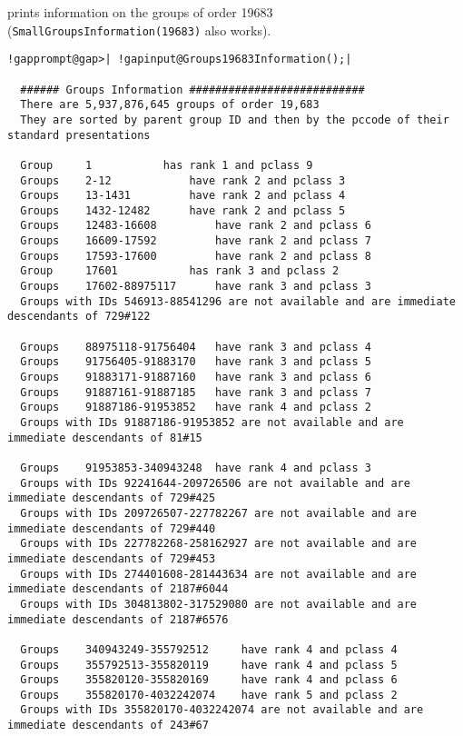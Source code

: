 \documentclass[a4paper,11pt]{report}
\begin{document}
{{{ prints information on the groups of order 19683 (\texttt{SmallGroupsInformation(19683)} also works). 
\begin{Verbatim}[commandchars=!@|,fontsize=\small,frame=single,label=Example]
  !gapprompt@gap>| !gapinput@Groups19683Information();|
  
  ###### Groups Information ###########################
  There are 5,937,876,645 groups of order 19,683
  They are sorted by parent group ID and then by the pccode of their standard presentations
  
  Group 	1 			has rank 1 and pclass 9
  Groups 	2-12 			have rank 2 and pclass 3
  Groups 	13-1431 		have rank 2 and pclass 4
  Groups 	1432-12482 		have rank 2 and pclass 5
  Groups 	12483-16608 		have rank 2 and pclass 6
  Groups 	16609-17592 		have rank 2 and pclass 7
  Groups 	17593-17600 		have rank 2 and pclass 8
  Group 	17601 			has rank 3 and pclass 2
  Groups 	17602-88975117 		have rank 3 and pclass 3
  Groups with IDs 546913-88541296 are not available and are immediate descendants of 729#122
  
  Groups 	88975118-91756404 	have rank 3 and pclass 4
  Groups 	91756405-91883170 	have rank 3 and pclass 5
  Groups 	91883171-91887160 	have rank 3 and pclass 6
  Groups 	91887161-91887185 	have rank 3 and pclass 7
  Groups 	91887186-91953852 	have rank 4 and pclass 2
  Groups with IDs 91887186-91953852 are not available and are immediate descendants of 81#15
  
  Groups 	91953853-340943248 	have rank 4 and pclass 3
  Groups with IDs 92241644-209726506 are not available and are immediate descendants of 729#425
  Groups with IDs 209726507-227782267 are not available and are immediate descendants of 729#440
  Groups with IDs 227782268-258162927 are not available and are immediate descendants of 729#453
  Groups with IDs 274401608-281443634 are not available and are immediate descendants of 2187#6044
  Groups with IDs 304813802-317529080 are not available and are immediate descendants of 2187#6576
  
  Groups 	340943249-355792512 	have rank 4 and pclass 4
  Groups 	355792513-355820119 	have rank 4 and pclass 5
  Groups 	355820120-355820169 	have rank 4 and pclass 6
  Groups 	355820170-4032242074 	have rank 5 and pclass 2
  Groups with IDs 355820170-4032242074 are not available and are immediate descendants of 243#67
  

\end{Verbatim}}}}
\end{document}
